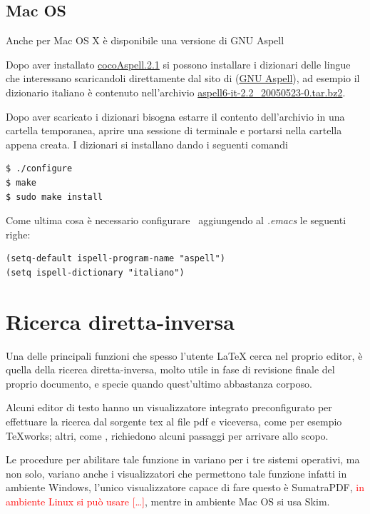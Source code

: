 \documentclass[11pt,a4paper]{article}
\begin{document}
\subsection{Mac OS}
\label{sec:aspellmac}

Anche per Mac OS X è disponibile una versione di \textsf{GNU Aspell}

Dopo aver installato \href{http://people.ict.usc.edu/~leuski/%
  cocoaspell/cocoAspell.2.1.dmg}{cocoAspell.2.1} si possono installare
i dizionari delle lingue che interessano scaricandoli direttamente dal
sito di (\href{ftp://ftp.gnu.org/gnu/aspell/dict/}{\textsf{GNU
    Aspell}}), ad esempio il dizionario italiano è contenuto
nell'archivio
\href{ftp://ftp.gnu.org/gnu/aspell/dict/it/aspell6-it-2.2_20050523-0.tar.bz2}%
{aspell6-it-2.2\_20050523-0.tar.bz2}.

Dopo aver scaricato i dizionari bisogna estarre il contento
dell'archivio in una cartella temporanea, aprire una sessione di
terminale e portarsi nella cartella appena creata. I dizionari si
installano dando i seguenti comandi
\begin{Verbatim}
$ ./configure
$ make
$ sudo make install
\end{Verbatim}

Come ultima cosa è necessario configurare \emacs\ aggiungendo al
\emph{.emacs} le seguenti righe:
\begin{Verbatim}
(setq-default ispell-program-name "aspell")
(setq ispell-dictionary "italiano")
\end{Verbatim}

\section{Ricerca diretta-inversa}
\label{sec:ricdirinv}

Una delle principali funzioni che spesso l'utente \LaTeX{} cerca nel
proprio editor, è quella della ricerca diretta-inversa, molto utile in
fase di revisione finale del proprio documento, e specie quando
quest'ultimo abbastanza corposo.

Alcuni editor di testo hanno un visualizzatore integrato
preconfigurato per effettuare la ricerca dal sorgente tex al file pdf
e viceversa, come per esempio \TeX works; altri, come \emacs,
richiedono alcuni passaggi per arrivare allo scopo.

Le procedure per abilitare tale funzione in \emacs{} variano per i tre
sistemi operativi, ma non solo, variano anche i visualizzatori che
permettono tale funzione infatti in ambiente Windows, l'unico
visualizzatore capace di fare questo è SumatraPDF,
\textcolor{red}{in ambiente Linux si può usare [\ldots]}, mentre in
ambiente Mac OS si usa Skim.
\end{document}

